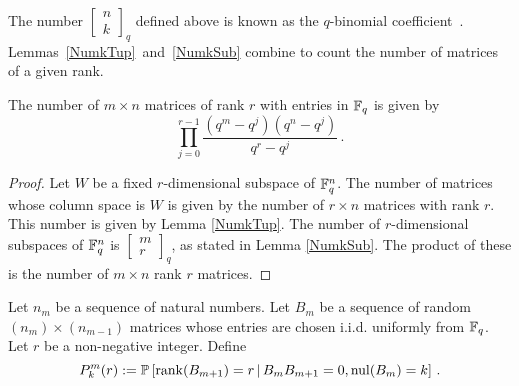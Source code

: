 The number $\left[\begin{smallmatrix}n\\k\end{smallmatrix}\right]_q$ defined above is known as the $q$-binomial
coefficient~\cite{stanley2011enumerative}.  
Lemmas~\ref{NumkTup}~and~\ref{NumkSub} combine to count the number of matrices
of a given rank. %

\begin{lemma}\label{Num_mbyn_rankr}
The number of $m\times n$ matrices of rank $r$ with entries in $\mathbb{F}_q$ is given by
\begin{equation*}
      \prod_{j=0}^{r-1} \frac{(q^m-q^j) (q^n - q^j)}{q^r - q^j} \, .
\end{equation*}
\end{lemma}

\begin{proof}
  Let $W$ be a fixed $r$-dimensional subspace of $\mathbb{F}_q^{n}$.  The number of
  matrices whose column space is $W$ is given by the number of $r\times n$
  matrices with rank $r$.  This number is given by Lemma \ref{NumkTup}. The
  number of $r$-dimensional subspaces of $\mathbb{F}_q^{n}$ is
  $\left[\begin{smallmatrix}m\\r\end{smallmatrix}\right]_q$,  as stated in
  Lemma \ref{NumkSub}.  The product of these is the number of $m\times n$
  rank $r$ matrices.
\end{proof}


\begin{definition}\label{defPkmr}
Let $n_m$ be a sequence of natural numbers. Let $B_m$ be a sequence of random $(n_m) \times (n_{m-1})$ matrices whose entries are chosen i.i.d. uniformly from $\mathbb{F}_q$. Let $r$ be a non-negative integer.  Define 
\[
  P^m_k(r) := \mathbb{P} 
  \left[\operatorname{\mathrm{rank}}(B_{m+1}) = r \,|\, B_{m}B_{m+1} = 0, \mathrm{nul}(B_{m}) = k \right] \, .
\]
\end{definition}

